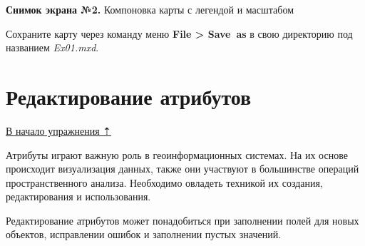\documentclass[12pt,]{book}
\begin{document}
\textbf{Снимок экрана №2.} Компоновка карты с легендой и масштабом

Сохраните карту через команду меню \textbf{File \textgreater{} Save~as} в свою директорию под названием \emph{Ex01.mxd}.

\hypertarget{map-design-quaternary-attributes}{%
\section{Редактирование атрибутов}\label{map-design-quaternary-attributes}}

\protect\hyperlink{map-design-quaternary}{В начало упражнения ⇡}

Атрибуты играют важную роль в геоинформационных системах. На их основе происходит визуализация данных, также они участвуют в большинстве операций пространственного анализа. Необходимо овладеть техникой их создания, редактирования и использования.

Редактирование атрибутов может понадобиться при заполнении полей для новых объектов, исправлении ошибок и заполнении пустых значений.
\end{document}
